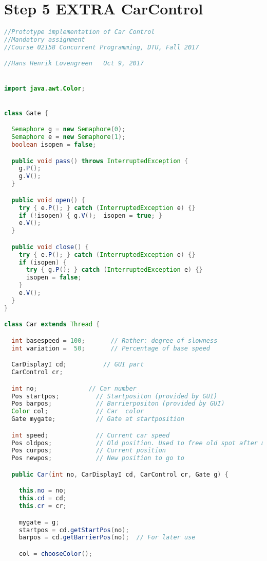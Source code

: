 \section*{Step 5 EXTRA CarControl}
\begin{lstlisting}[language=java]
//Prototype implementation of Car Control
//Mandatory assignment
//Course 02158 Concurrent Programming, DTU, Fall 2017

//Hans Henrik Lovengreen   Oct 9, 2017


import java.awt.Color;


class Gate {

  Semaphore g = new Semaphore(0);
  Semaphore e = new Semaphore(1);
  boolean isopen = false;

  public void pass() throws InterruptedException {
    g.P(); 
    g.V();
  }

  public void open() {
    try { e.P(); } catch (InterruptedException e) {}
    if (!isopen) { g.V();  isopen = true; }
    e.V();
  }

  public void close() {
    try { e.P(); } catch (InterruptedException e) {}
    if (isopen) { 
      try { g.P(); } catch (InterruptedException e) {}
      isopen = false;
    }
    e.V();
  }
}

class Car extends Thread {

  int basespeed = 100;       // Rather: degree of slowness
  int variation =  50;       // Percentage of base speed

  CarDisplayI cd;          // GUI part
  CarControl cr;

  int no;              // Car number
  Pos startpos;          // Startpositon (provided by GUI)
  Pos barpos;            // Barrierpositon (provided by GUI)
  Color col;             // Car  color
  Gate mygate;           // Gate at startposition

  int speed;             // Current car speed
  Pos oldpos;            // Old position. Used to free old spot after move.
  Pos curpos;            // Current position 
  Pos newpos;            // New position to go to

  public Car(int no, CarDisplayI cd, CarControl cr, Gate g) {

    this.no = no;
    this.cd = cd;
    this.cr = cr;

    mygate = g;
    startpos = cd.getStartPos(no);
    barpos = cd.getBarrierPos(no);  // For later use

    col = chooseColor();


\end{lstlisting}
